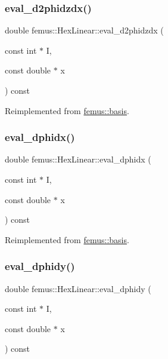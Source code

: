 \subsubsection{\texorpdfstring{eval\+\_\+d2phidzdx()}{eval\_d2phidzdx()}}
{\footnotesize\ttfamily double femus\+::\+Hex\+Linear\+::eval\+\_\+d2phidzdx (\begin{DoxyParamCaption}\item[{const int $\ast$}]{I,  }\item[{const double $\ast$}]{x }\end{DoxyParamCaption}) const\hspace{0.3cm}{\ttfamily [virtual]}}



Reimplemented from \mbox{\hyperlink{classfemus_1_1basis_a5d619ec5bd57b7d2dc34a99d69975c77}{femus\+::basis}}.

\mbox{\label{classfemus_1_1_hex_linear_a4c26f08a33fb379f6d6b844ec0eac8c5}} 
\subsubsection{\texorpdfstring{eval\+\_\+dphidx()}{eval\_dphidx()}}
{\footnotesize\ttfamily double femus\+::\+Hex\+Linear\+::eval\+\_\+dphidx (\begin{DoxyParamCaption}\item[{const int $\ast$}]{I,  }\item[{const double $\ast$}]{x }\end{DoxyParamCaption}) const\hspace{0.3cm}{\ttfamily [virtual]}}



Reimplemented from \mbox{\hyperlink{classfemus_1_1basis_a4db7d29cf8a753ddbccc4a297dafa0bf}{femus\+::basis}}.

\mbox{\label{classfemus_1_1_hex_linear_a04a870728a2d2d135fe8351315e42d7e}} 
\subsubsection{\texorpdfstring{eval\+\_\+dphidy()}{eval\_dphidy()}}
{\footnotesize\ttfamily double femus\+::\+Hex\+Linear\+::eval\+\_\+dphidy (\begin{DoxyParamCaption}\item[{const int $\ast$}]{I,  }\item[{const double $\ast$}]{x }\end{DoxyParamCaption}) const\hspace{0.3cm}{\ttfamily [virtual]}}



